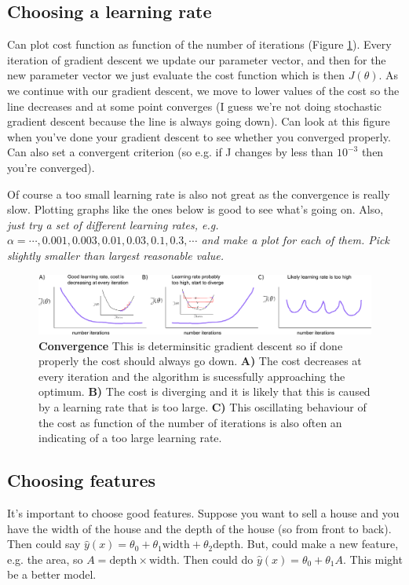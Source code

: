 \documentclass[a4paper, 10pt,hidelinks]{article}
\begin{document}
\subsection{Choosing a learning rate}
Can plot cost function as function of the number of iterations (Figure \ref{Fig: Learning rate figure}). Every iteration of gradient descent we update our parameter vector, and then for the new parameter vector we just evaluate the cost function which is then $J(\theta)$. As we continue with our gradient descent, we move to lower values of the cost so the line decreases and at some point converges (I guess we're not doing stochastic gradient descent because the line is always going down). Can look at this figure when you've done your gradient descent to see whether you converged properly. Can also set a convergent criterion (so e.g. if J changes by less than $10^{-3}$ then you're converged).

Of course a too small learning rate is also not great as the convergence is really slow. Plotting graphs like the ones below is good to see what's going on. Also, \emph{just try a set of different learning rates, e.g. $\alpha = \cdots, 0.001, 0.003, 0.01, 0.03, 0.1, 0.3, \cdots$ and make a plot for each of them. Pick slightly smaller than largest reasonable value.} 

\begin{figure}[h!]
\includegraphics[width=0.94\linewidth]{LearningRate}
\caption{\footnotesize{\textbf{Convergence} {This is determinsitic gradient descent so if done properly the cost should always go down. \textbf{A)} The cost decreases at every iteration and the algorithm is sucessfully approaching the optimum. \textbf{B)} The cost is diverging and it is likely that this is caused by a learning rate that is too large. \textbf{C)} This oscillating behaviour of the cost as function of the number of iterations is also often an indicating of a too large learning rate. }}}
\label{Fig: Learning rate figure}
\end{figure}

\subsection{Choosing features}
It's important to choose good features. Suppose you want to sell a house and you have the width of the house and the depth of the house (so from front to back). Then could say $\hat{y}(x) = \theta_0 + \theta_1 \text{width} + \theta_2 \text{depth}$. But, could make a new feature, e.g. the area, so $A = \text{depth} \times \text{width}$. Then could do $\hat{y}(x) = \theta_0 + \theta_1 A$. This might be a better model.
\end{document}
